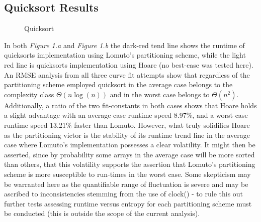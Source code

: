 \documentclass[11pt,letterpaper]{report}
\begin{document}
\subsection*{Quicksort Results}
\begin{figure}[h]
  \centering
  \hfill
  \caption{Quicksort}
\end{figure}

In both \emph{Figure 1.a} and \emph{Figure 1.b} the dark-red tend line shows the runtime of quicksorts implementation using Lomuto's partitioning scheme, while the light red line is quicksorts implementation using Hoare (no best-case was tested here). An RMSE analysis from all three curve fit attempts show that regardless of the partitioning scheme employed quicksort in the average case belongs to the complexity class $\Theta (n \log{}(n))$ and in the worst case belongs to $\Theta(n^2)$. Additionally, a ratio of the two fit-constants in both cases shows that Hoare holds a slight advantage with an average-case runtime speed 8.97\%, and a worst-case runtime speed 13.21\% faster than Lomuto. However, what truly solidifies Hoare as the partitioning victor is the stability of its runtime trend line in the average case where Lomuto's implementation possesses a clear volatility. It might then be asserted, since by probability some arrays in the average case will be more sorted than others, that this volatility supports the assertion that Lomuto's partitioning scheme is more susceptible to run-times in the worst case. Some skepticism may be warranted here as the quantifiable range of fluctuation is severe and may be ascribed to inconsistencies stemming from the use of clock() - to rule this out further tests assessing runtime versus entropy for each partitioning scheme must be conducted (this is outside the scope of the current analysis).
\end{document}
